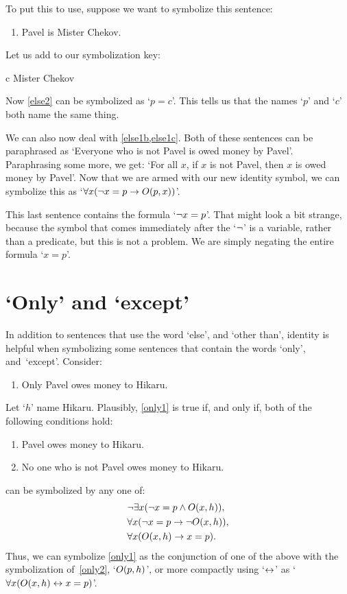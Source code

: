 To put this to use, suppose we want to symbolize this sentence:
\begin{enumerate}
\item\label{else2} Pavel is Mister Chekov.
\end{enumerate}
Let us add to our symbolization key:
	\begin{ekey}
		\item[c] Mister Chekov
	\end{ekey}
Now \cref*{else2} can be symbolized as `$p=c$'. This tells us that the names `$p$' and `$c$' both name the same thing.

We can also now deal with \cref{else1b,else1c}. Both of these sentences can be  paraphrased as `Everyone who is not Pavel is owed money by Pavel'. Paraphrasing some more, we get: `For all $x$, if $x$ is not Pavel, then $x$ is owed money by Pavel'. Now that we are armed with our new identity symbol, we can symbolize this as `$\forall x (\neg x = p \rightarrow O(p,x))$'.

This last sentence contains the formula `$\neg x = p$'. That might look a bit strange, because the symbol that comes immediately after the `$\neg$' is a variable, rather than a predicate, but this is not a problem. We are simply negating the entire formula `$x = p$'.

\section{`Only' and `except'}

In addition to sentences that use the word `else', and `other than', identity is helpful when symbolizing some sentences that contain the words `only', and~`except'. Consider:
\begin{enumerate}
\item\label{only1} Only Pavel owes money to Hikaru.
\end{enumerate}
Let `$h$' name Hikaru. Plausibly, \cref*{only1} is true if, and only if, both of the following conditions hold:
\begin{enumerate}
	\item\label{only2} Pavel owes money to Hikaru.
	\item\label{else3} No one who is not Pavel owes money to Hikaru.
\end{enumerate}
 can be symbolized by any one of:
\begin{align*}
	& \neg\exists x(\neg x = p \wedge O(x,h)),\\
	& \forall x(\neg x = p \rightarrow \neg O(x,h)),\\
	& \forall x(O(x,h) \rightarrow x = p).
\end{align*}
Thus, we can symbolize \cref*{only1} as the conjunction of one of the above with the symbolization of~\cref*{only2}, `$O(p,h)$', or more compactly using `$\leftrightarrow$' as `$\forall x(O(x,h) \leftrightarrow x = p)$'.

